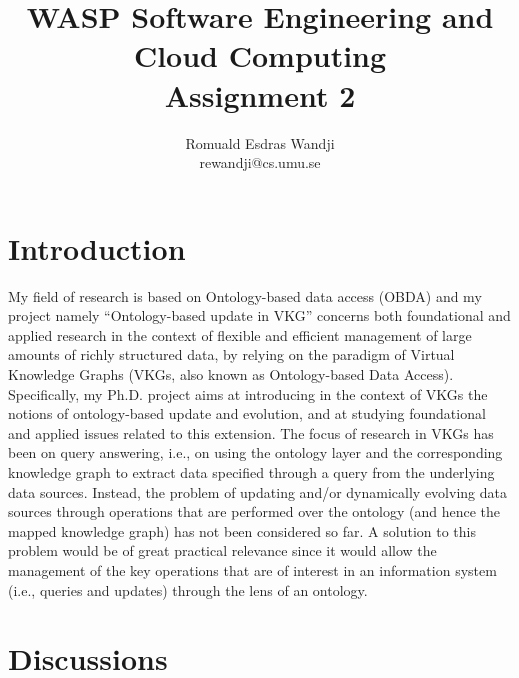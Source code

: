 \documentclass{article}
\title{WASP Software Engineering and Cloud Computing\\Assignment 2}
\author{Romuald Esdras Wandji\\rewandji@cs.umu.se}
\begin{document}
\maketitle

\section{Introduction}

My field of research is based on Ontology-based data access (OBDA) and my project namely “Ontology-based update in VKG” concerns both foundational and applied research in the context of flexible and efficient management of large amounts of richly structured data, by relying on the paradigm of Virtual Knowledge Graphs (VKGs, also known as Ontology-based Data Access). Specifically, my Ph.D. project aims at introducing in the context of VKGs the notions of ontology-based update and evolution, and at studying foundational and applied issues related to this extension. The focus of research in VKGs has been on query answering, i.e., on using the ontology layer and the corresponding knowledge graph to extract data specified through a query from the underlying data sources. Instead, the problem of updating and/or dynamically evolving data sources through operations that are performed over the ontology (and hence the mapped knowledge graph) has not been considered so far. A solution to this problem would be of great practical relevance since it would allow the management of the key operations that are of interest in an information system (i.e., queries and updates) through the lens of an ontology.

\section{Discussions}
\end{document}
